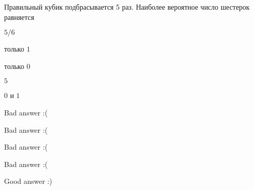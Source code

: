 
\begin{question}
Правильный кубик подбрасывается 5 раз. Наиболее вероятное число шестерок
равняется
\begin{answerlist}
  \item \(5/6\)
  \item только \(1\)
  \item только \(0\)
  \item \(5\)
  \item \(0\) и \(1\)
\end{answerlist}
\end{question}

\begin{solution}
\begin{answerlist}
  \item Bad answer :(
  \item Bad answer :(
  \item Bad answer :(
  \item Bad answer :(
  \item Good answer :)
\end{answerlist}
\end{solution}

